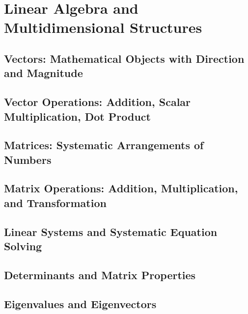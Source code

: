 

\chapter{Linear Algebra and Multidimensional Structures}

\section{Vectors: Mathematical Objects with Direction and Magnitude}

\section{Vector Operations: Addition, Scalar Multiplication, Dot Product}

\section{Matrices: Systematic Arrangements of Numbers}

\section{Matrix Operations: Addition, Multiplication, and Transformation}

\section{Linear Systems and Systematic Equation Solving}

\section{Determinants and Matrix Properties}

\section{Eigenvalues and Eigenvectors}
